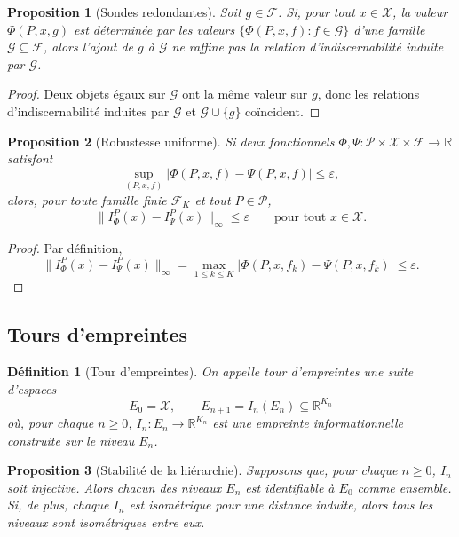 \documentclass[11pt,a4paper]{article}
\newtheorem{definition}{Définition}
\newtheorem{proposition}{Proposition}
\begin{document}
\begin{appendices}
\begin{proposition}[Sondes redondantes]
Soit \(g\in\mathcal F\). Si, pour tout \(x\in\mathcal X\), la valeur \(\Phi(P,x,g)\) est déterminée par les valeurs \(\{\Phi(P,x,f):f\in\mathcal G\}\) d'une famille \(\mathcal G\subseteq\mathcal F\), alors l'ajout de \(g\) à \(\mathcal G\) ne raffine pas la relation d'indiscernabilité induite par \(\mathcal G\).
\end{proposition}

\begin{proof}
Deux objets égaux sur \(\mathcal G\) ont la même valeur sur \(g\), donc les relations d'indiscernabilité induites par \(\mathcal G\) et \(\mathcal G\cup\{g\}\) coïncident.
\end{proof}

\begin{proposition}[Robustesse uniforme]
Si deux fonctionnels \(\Phi,\Psi:\mathcal P\times\mathcal X\times\mathcal F\to\mathbb R\) satisfont
\[
\sup_{(P,x,f)}|\Phi(P,x,f)-\Psi(P,x,f)|\le \varepsilon,
\]
alors, pour toute famille finie \(\mathcal F_K\) et tout \(P\in\mathcal P\),
\[
\|I_\Phi^P(x)-I_\Psi^P(x)\|_\infty\le \varepsilon
\qquad
\text{pour tout }x\in\mathcal X.
\]
\end{proposition}

\begin{proof}
Par définition,
\[
\|I_\Phi^P(x)-I_\Psi^P(x)\|_\infty
=
\max_{1\le k\le K} |\Phi(P,x,f_k)-\Psi(P,x,f_k)|
\le \varepsilon.
\]
\end{proof}

\subsection{Tours d'empreintes}

\begin{definition}[Tour d'empreintes]
On appelle \emph{tour d'empreintes} une suite d'espaces
\[
E_0=\mathcal X,\qquad E_{n+1}=I_n(E_n)\subseteq \mathbb R^{K_n}
\]
où, pour chaque \(n\ge 0\), \(I_n:E_n\to \mathbb R^{K_n}\) est une empreinte informationnelle construite sur le niveau \(E_n\).
\end{definition}

\begin{proposition}[Stabilité de la hiérarchie]
Supposons que, pour chaque \(n\ge 0\), \(I_n\) soit injective. Alors chacun des niveaux \(E_n\) est identifiable à \(E_0\) comme ensemble. Si, de plus, chaque \(I_n\) est isométrique pour une distance induite, alors tous les niveaux sont isométriques entre eux.
\end{proposition}


\end{appendices}
\end{document}

